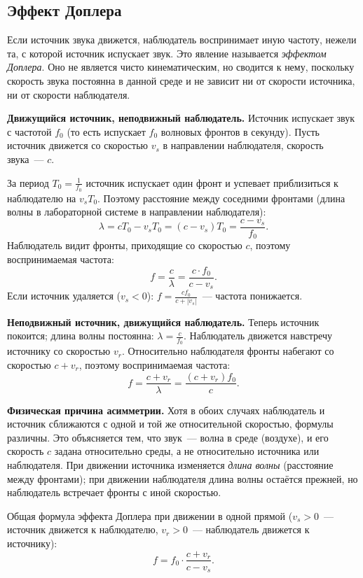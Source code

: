 \documentclass[../main.tex]{subfiles}
\begin{document}
\subsection{Эффект Доплера}

Если источник звука движется, наблюдатель воспринимает иную частоту,
нежели та, с которой источник испускает звук.
Это явление называется \textit{эффектом Доплера}.
Оно не является чисто кинематическим, но сводится к нему,
поскольку скорость звука постоянна в данной среде
и не зависит ни от скорости источника, ни от скорости наблюдателя.

\noindent\textbf{Движущийся источник, неподвижный наблюдатель.}
Источник испускает звук с частотой $f_0$ (то есть испускает
$f_0$ волновых фронтов в секунду). Пусть источник движется
со скоростью $v_s$ в направлении наблюдателя, скорость звука~--- $c$.

За период $T_0 = \frac{1}{f_0}$ источник испускает один фронт
и успевает приблизиться к наблюдателю на $v_s T_0$.
Поэтому расстояние между соседними фронтами (длина волны
в лабораторной системе в направлении наблюдателя):
\[
    \lambda = c T_0 - v_s T_0 = (c - v_s) T_0 = \frac{c - v_s}{f_0}.
\]
Наблюдатель видит фронты, приходящие со скоростью $c$,
поэтому воспринимаемая частота:
\[
    f = \frac{c}{\lambda} = \frac{c \cdot f_0}{c - v_s}.
\]
Если источник удаляется ($v_s < 0$): $f = \frac{c f_0}{c + |v_s|}$~--- частота понижается.

\noindent\textbf{Неподвижный источник, движущийся наблюдатель.}
Теперь источник покоится; длина волны постоянна: $\lambda = \frac{c}{f_0}$.
Наблюдатель движется навстречу источнику со скоростью $v_r$.
Относительно наблюдателя фронты набегают со скоростью $c + v_r$,
поэтому воспринимаемая частота:
\[
    f = \frac{c + v_r}{\lambda} = \frac{(c + v_r) f_0}{c}.
\]

\noindent\textbf{Физическая причина асимметрии.}
Хотя в обоих случаях наблюдатель и источник сближаются с одной и
той же относительной скоростью, формулы различны.
Это объясняется тем, что звук~--- волна в среде (воздухе),
и его скорость $c$ задана относительно среды, а не
относительно источника или наблюдателя.
При движении источника изменяется \textit{длина волны}
(расстояние между фронтами); при движении наблюдателя
длина волны остаётся прежней, но наблюдатель встречает
фронты с иной скоростью.

\begin{definition}
Общая формула эффекта Доплера при движении в одной прямой
($v_s > 0$~--- источник движется к наблюдателю,
$v_r > 0$~--- наблюдатель движется к источнику):
\[
    f = f_0 \cdot \frac{c + v_r}{c - v_s}.
\]
\end{definition}
\end{document}
